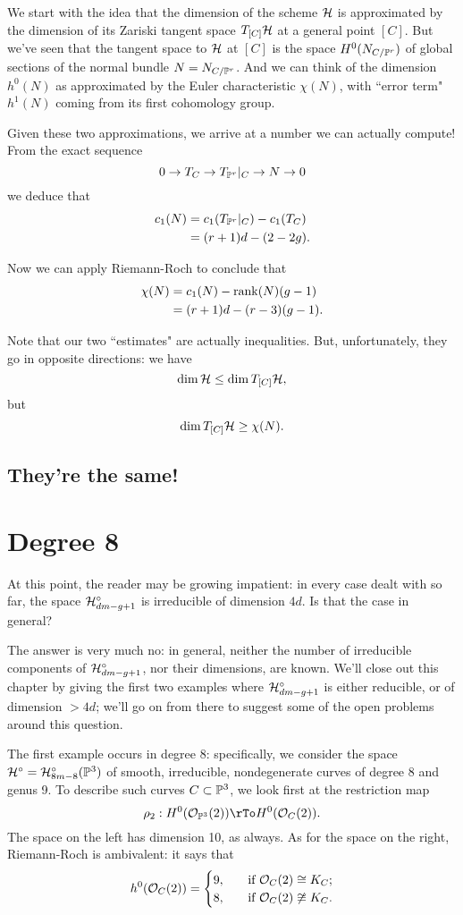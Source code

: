 We start with the idea that the dimension of the scheme ${\cal H}$ is approximated by the dimension of its Zariski tangent space $T_{[C]}{\cal H}$ at a general point $[C]$. But we've seen that the tangent space to ${\cal H}$ at $[C]$ is the space $H^0(N_{C/{\mathbb P}^r})$ of global sections of the normal bundle $N = N_{C/{\mathbb P}^r}$. And we can think of the dimension $h^0(N)$ as approximated by the Euler characteristic $\chi(N)$, with ``error term" $h^1(N)$ coming from its first cohomology group.

Given these two approximations, we arrive at a number we can actually compute! From the exact sequence
$$
0 \to T_C \to T_{{\mathbb P}^r}|_C \to N \to 0
$$
we deduce that
\begin{align*}
c_1(N) &= c_1(T_{{\mathbb P}^r}|_C) - c_1(T_C) \\
&= (r+1)d - (2-2g).
\end{align*}

Now we can apply Riemann-Roch to conclude that
\begin{align*}
\chi(N) &= c_1(N) - \operatorname{rank}(N)(g-1) \\
&= (r+1)d - (r-3)(g-1).
\end{align*}

Note that our two ``estimates" are actually inequalities. But, unfortunately, they go in opposite directions: we have
$$
\dim {\cal H} \leq \dim T_{[C]}{\cal H},
$$
but 
$$
\dim T_{[C]}{\cal H} \geq \chi(N).
$$


\subsection{They're the same!}

\section{Degree 8}

At this point, the reader may be growing impatient: in every case dealt with so far, the space ${\cal H}^\circ_{dm-g+1}$ is irreducible of dimension $4d$. Is that the case in general?

The answer is very much no: in general, neither the number of irreducible components of ${\cal H}^\circ_{dm-g+1}$, nor their dimensions, are known. We'll close out this chapter by giving the first two examples where ${\cal H}^\circ_{dm-g+1}$ is either reducible, or of dimension $>4d$; we'll go on from there to suggest some of the open problems around this question.

The first example occurs in degree 8: specifically, we consider the space ${\cal H}^\circ = {\cal H}^\circ_{8m-8}({\mathbb P}^3)$ of smooth, irreducible, nondegenerate curves of degree 8 and genus 9. To describe such curves $C \subset {\mathbb P}^3$, we look first at the restriction map
$$
\rho_2 : H^0(\cO_{\PP^3}(2)) \rTo H^0(\cO_C(2)).
$$
The space on the left has dimension 10, as always. As for the space on the right, Riemann-Roch is ambivalent: it says that
\begin{align*}
h^0({\mathcal O}_C(2)) =
\begin{cases}
9, \quad &\text{if } {\mathcal O}_C(2) \cong K_C; \\
8,  \quad &\text{if } {\mathcal O}_C(2) \not\cong K_C.
\end{cases}
\end{align*}

